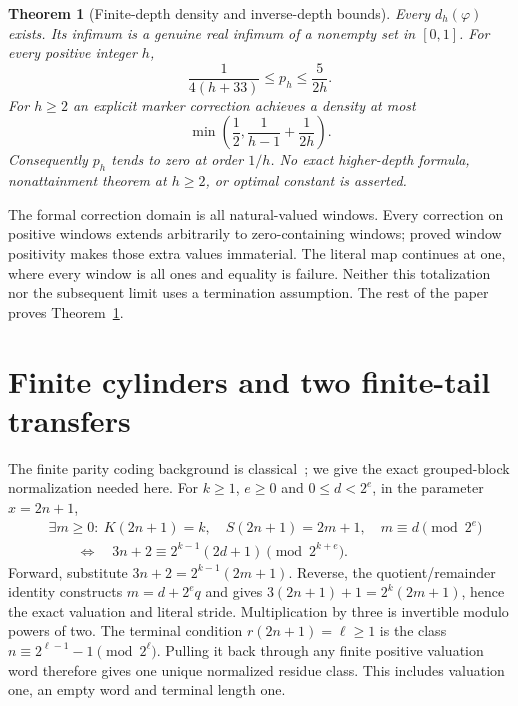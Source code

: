 \documentclass[11pt,letterpaper]{article}
\newtheorem{theorem}{Theorem}
\begin{document}
\begin{theorem}[Finite-depth density and inverse-depth bounds]\label{thm:rate}
Every $d_h(\varphi)$ exists. Its infimum is a genuine real infimum of a nonempty
set in $[0,1]$. For every positive integer $h$,
\begin{equation}\label{eq:strong-rate}
 \frac1{4(h+33)}\le p_h\le\frac5{2h}.
\end{equation}
For $h\ge2$ an explicit marker correction achieves a density at most
\begin{equation}\label{eq:marker-cap}
 \min\left(\frac12,\frac1{h-1}+\frac1{2h}\right).
\end{equation}
Consequently $p_h$ tends to zero at order $1/h$. No exact higher-depth formula,
nonattainment theorem at $h\ge2$, or optimal constant is asserted.
\end{theorem}

The formal correction domain is all natural-valued windows. Every correction
on positive windows extends arbitrarily to zero-containing windows; proved
window positivity makes those extra values immaterial. The literal map
continues at one, where every window is all ones and equality is failure.
Neither this totalization nor the subsequent limit uses a termination
assumption. The rest of the paper proves Theorem~\ref{thm:rate}.

\section{Finite cylinders and two finite-tail transfers}\label{sec:general-density}
The finite parity coding background is classical~\cite{terras,bernstein-lagarias};
we give the exact grouped-block normalization needed here. For $k\ge1$, $e\ge0$
and $0\le d<2^e$, in the parameter $x=2n+1$,
\begin{align*}
 &\exists m\ge0:\ K(2n+1)=k,\quad S(2n+1)=2m+1,
                       \quad m\equiv d\pmod{2^e}\\
 &\hspace{2em}\Longleftrightarrow\quad
 3n+2\equiv2^{k-1}(2d+1)\pmod{2^{k+e}}.
\end{align*}
Forward, substitute $3n+2=2^{k-1}(2m+1)$. Reverse, the quotient/remainder
identity constructs $m=d+2^e q$ and gives
$3(2n+1)+1=2^k(2m+1)$, hence the exact valuation and literal stride.
Multiplication by three is invertible modulo powers of two. The terminal
condition $r(2n+1)=\ell\ge1$ is the class
$n\equiv2^{\ell-1}-1\pmod{2^\ell}$. Pulling it back through any finite
positive valuation word therefore gives one unique normalized residue class.
This includes valuation one, an empty word and terminal length one.
\end{document}
